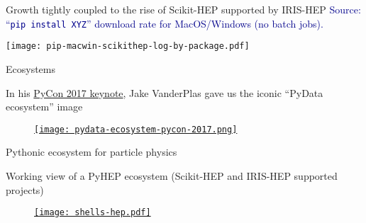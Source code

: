 \begin{frame}{Growth tightly coupled to the rise of Scikit-HEP supported by IRIS-HEP}
\vspace{0.25 cm}
\textcolor{darkblue}{Source: ``\texttt{pip install XYZ}'' download rate for MacOS/Windows (no batch jobs).}

\vspace{0.1 cm}
\texttt{[image: pip-macwin-scikithep-log-by-package.pdf]}
\end{frame}

\begin{frame}{Ecosystems}
\vspace{0.25 cm}
\begin{center}
    {\small In his \href{https://youtu.be/ZyjCqQEUa8o}{PyCon 2017 keynote}, Jake VanderPlas gave us the iconic ``PyData ecosystem'' image}
\end{center}

\vspace{0.1 cm}
\begin{figure}
    \begin{center}
        \href{https://coiled.io/blog/pydata-dask/}{\texttt{[image: pydata-ecosystem-pycon-2017.png]}}
    \end{center}
\end{figure}
\end{frame}

\begin{frame}{Pythonic ecosystem for particle physics}
\vspace{0.25 cm}
\begin{center}
    {\small Working view of a PyHEP ecosystem (Scikit-HEP and IRIS-HEP supported projects)}
\end{center}

\begin{figure}
    \begin{center}
        \href{https://indico.cern.ch/event/1140031/}{\texttt{[image: shells-hep.pdf]}}
    \end{center}
\end{figure}
\end{frame}


